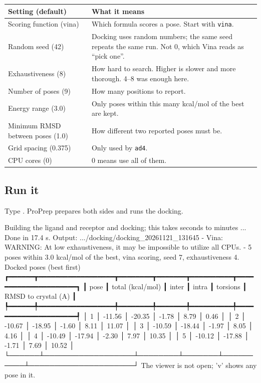 \begin{tabularx}{\linewidth}{@{}lL@{}}
\toprule
\textbf{Setting (default)} & \textbf{What it means} \\
\midrule
Scoring function (vina) & Which formula scores a pose. Start with
  \texttt{vina}. \\
Random seed (42) & Docking uses random numbers; the same seed repeats the
  same run. Not 0, which Vina reads as ``pick one''. \\
Exhaustiveness (8) & How hard to search. Higher is slower and more thorough.
  4--8 was enough here. \\
Number of poses (9) & How many positions to report. \\
Energy range (3.0) & Only poses within this many kcal/mol of the best are
  kept. \\
Minimum RMSD between poses (1.0) & How different two reported poses must be. \\
Grid spacing (0.375) & Only used by \texttt{ad4}. \\
CPU cores (0) & 0 means use all of them. \\
\bottomrule
\end{tabularx}

\subsection{Run it}

Type . ProPrep prepares both sides and runs the docking.

\begin{screen}
  Building the ligand and receptor and docking; this takes seconds to
  minutes ...
  Done in 17.4 s. Output: .../docking/docking_20261121_131645
  - Vina: WARNING: At low exhaustiveness, it may be impossible to utilize
    all CPUs.
  - 5 poses within 3.0 kcal/mol of the best, vina scoring, seed 7,
    exhaustiveness 4.
Docked poses (best first)
┏━━━━━━┳━━━━━━━━━━━━━━━━━━┳━━━━━━━━┳━━━━━━━┳━━━━━━━━━━┳━━━━━━━━━━━━━━━━━━━━━┓
┃ pose ┃ total (kcal/mol) ┃ inter  ┃ intra ┃ torsions ┃ RMSD to crystal (A) ┃
┡━━━━━━╇━━━━━━━━━━━━━━━━━━╇━━━━━━━━╇━━━━━━━╇━━━━━━━━━━╇━━━━━━━━━━━━━━━━━━━━━┩
│ 1    │ -11.56           │ -20.35 │ -1.78 │ 8.79     │ 0.46                │
│ 2    │ -10.67           │ -18.95 │ -1.60 │ 8.11     │ 11.07               │
│ 3    │ -10.59           │ -18.44 │ -1.97 │ 8.05     │ 4.16                │
│ 4    │ -10.49           │ -17.94 │ -2.30 │ 7.97     │ 10.35               │
│ 5    │ -10.12           │ -17.88 │ -1.71 │ 7.69     │ 10.52               │
└──────┴──────────────────┴────────┴───────┴──────────┴─────────────────────┘
  The viewer is not open; 'v' shows any pose in it.
\end{screen}

